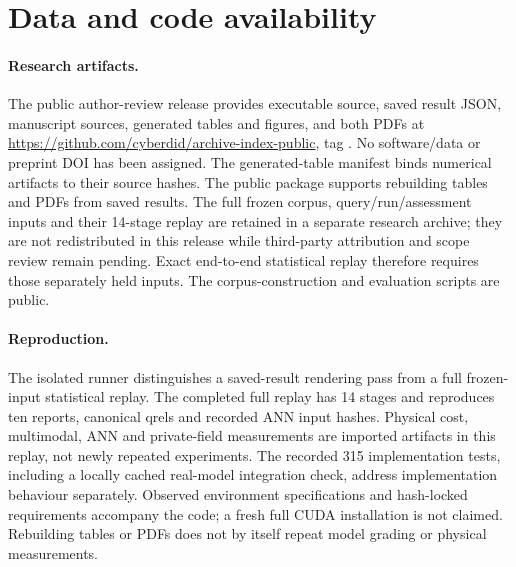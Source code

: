 \section{Data and code availability}\label{sec:availability}

\paragraph{Research artifacts.}
The public author-review release provides executable source, saved result JSON, manuscript sources, generated tables and figures, and both PDFs at \url{https://github.com/cyberdid/archive-index-public}, tag . No software/data or preprint DOI has been assigned. The generated-table manifest binds numerical artifacts to their source hashes. The public package supports rebuilding tables and PDFs from saved results. The full frozen corpus, query/run/assessment inputs and their 14-stage replay are retained in a separate research archive; they are not redistributed in this release while third-party attribution and scope review remain pending. Exact end-to-end statistical replay therefore requires those separately held inputs. The corpus-construction and evaluation scripts are public.

\paragraph{Reproduction.}
The isolated  runner distinguishes a saved-result rendering pass from a full frozen-input statistical replay. The completed full replay has 14 stages and reproduces ten reports, canonical qrels and recorded ANN input hashes. Physical cost, multimodal, ANN and private-field measurements are imported artifacts in this replay, not newly repeated experiments. The recorded 315 implementation tests, including a locally cached real-model integration check, address implementation behaviour separately. Observed environment specifications and hash-locked requirements accompany the code; a fresh full CUDA installation is not claimed. Rebuilding tables or PDFs does not by itself repeat model grading or physical measurements.


